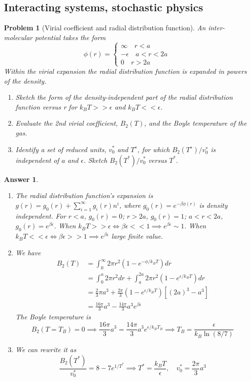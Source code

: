 \documentclass[a4paper]{article}
\theoremstyle{new2}
\newtheorem{ans}{Answer}[section]
\theoremstyle{new}
\newtheorem{qns}{Problem}[section]
\begin{document}
\subsection*{Interacting systems, stochastic physics}
\begin{qns}[Virial coefficient and radial distribution function]
An inter-molecular potential takes the form
\begin{equation*}
  \phi(r) = \begin{cases}
        \infty\quad r<a        \\
        -\epsilon\quad a<r<2a\\
        0\quad r>2a
        \end{cases}
 \end{equation*}
Within the virial expansion the radial distribution function is expanded in powers of the density. 
\begin{enumerate}[label=(\alph*)]
\item Sketch the form of the density-independent part of the radial distribution function versus r for $k_BT>>\epsilon$ and $k_BT<<\epsilon$. 
\item Evaluate the 2nd virial coefficient, $B_2(T)$, and the Boyle temperature of the gas. 
\item Identify a set of reduced units, $v_0^*$ and $T^∗$, for which $B_2(T^∗)/v^∗_0$ is independent of $a$ and $\epsilon$. Sketch $B_2(T^*)/v_0^*$ versus $T^*$.
\end{enumerate}
\end{qns}
\begin{ans}\leavevmode
\begin{enumerate}[label=(\alph*)]
\item The radial distribution function's expansion is $g(r)=g_0(r)+\sum_{i=1}^\infty g_i(r)n^i$, where $g_0(r)=e^{-\beta\phi(r)}$ is density independent. For $r<a$, $g_0(r)=0$; $r>2a$, $g_0(r)=1$; $a<r<2a$, $g_0(r)=e^{\beta\epsilon}$. When $k_BT>>\epsilon\iff\beta\epsilon<<1\implies e^{\beta\epsilon}\sim1$. When $k_BT<<\epsilon\iff\beta\epsilon>>1\implies e^{\beta\epsilon}$ large finite value.
\item We have
\begin{align}
    B_2(T)&=\int_0^\infty 2\pi r^2(1-e^{-\phi/k_BT})dr\nonumber\\&=\int_0^a2\pi r^2dr+\int_a^{2a}2\pi r^2(1-e^{\epsilon/k_BT})dr\nonumber\\&=\frac{2}{3}\pi a^3+\frac{2\pi}{3}(1-e^{\epsilon/k_BT})[(2a)^3-a^3]\nonumber\\&=\frac{16\pi}{3}a^3-\frac{14\pi}{3}a^3e^{\beta\epsilon}\nonumber
\end{align}
The Boyle temperature is
$$B_2(T=T_B)=0\implies\frac{16\pi}{3}a^3=\frac{14\pi}{3}a^3e^{\epsilon/k_BT_B}\implies T_B=\frac{\epsilon}{k_B\ln(8/7)}$$
\item We can rewrite it as
$$\frac{B_2(T^*)}{v_0^*}=8-7e^{1/T^*}\implies T^*=\frac{k_BT}{\epsilon},\quad v_0^*=\frac{2\pi}{3}a^3$$
\end{enumerate}
\end{ans}
\end{document}
